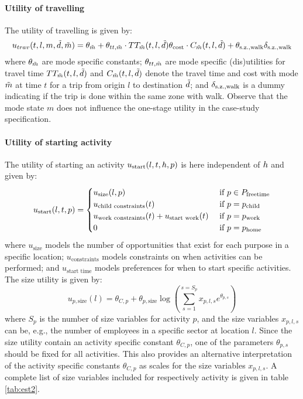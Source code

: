 \paragraph{Utility of travelling}
The utility of travelling is given by:
\begin{equation}
u_{trav}(t,l,m,\act{d},\act{m}) = \mc_{\act{m}} + \theta_{tt,\act{m}} \cdot \TT_{\act{m}}(t,l,\act{d}) \theta_{\cost} \cdot C_{\act{m}}(t,l,\act{d}) +\theta_{\geqfive} \dummy{\geqfive}
\end{equation}
where $\theta_{\tilde{m}}$ are mode specific constants; $\theta_{tt,\tilde{m}}$ are mode specific (dis)utilities for travel time  $TT_{\tilde{m}}(t,l,\tilde{d})$ and $C_{\tilde{m}}(t,l,\tilde{d})$ denote the travel time and cost with mode $\tilde{m}$ at time $t$ for a trip from origin $l$ to destination $\tilde{d}$; and $\delta_{\text{s.z.,walk}}$ is a dummy indicating if the trip is done within the same zone with walk. Observe that the mode state $m$ does not influence the one-stage utility in the case-study specification.

\paragraph{Utility of starting activity}
The utility of starting an activity $u_\text{start}(l,t,h, p)$ is here independent of $h$ and given by:
\begin{equation}
	\ustart(l,t,p) = \begin{cases}
	u_{\text{size}}(l,p) & \cif p \in P_{\text{freetime}} \\
	u_\text{child constraints}(t) & \cif p = \p{child} \\
	u_\text{work constraints}(t)  + u_{\text{start work}}(t) & \cif p = \p{work} \\
	0 & \cif p = \p{home}  
	\end{cases} 
\end{equation}
where $u_{\text{size}}$ models the number of opportunities that exist for each purpose in a specific location; $u_\text{constraints}$ models constraints on when activities can be performed; and $u_{\text{start time}}$ models preferences for when to start specific activities. The size utility is given by:
\begin{equation*}
u_{p,\text{size}}(l) =\theta_{C,p} + \theta_{p,\text{size}}\log \left( \sum_{s=1}^{s=S_p} x_{p,l,s}e^{\theta_{p,s}} \right)
\end{equation*}
where $S_p$ is the number of size variables for activity $p$, and the size variables $x_{p,l,s}$ can be, e.g., the number of employees in a specific sector at location $l$. Since the size utility contain an activity specific constant $\theta_{C,p}$, one of the parameters $\theta_{p,s}$ should be fixed for all activities. This also provides an alternative interpretation of the activity specific constants $\theta_{C,p}$ as scales for the size variables $x_{p,l,s}$. A complete list of size variables included for respectively activity is given in table \ref{tab:est2}. 

